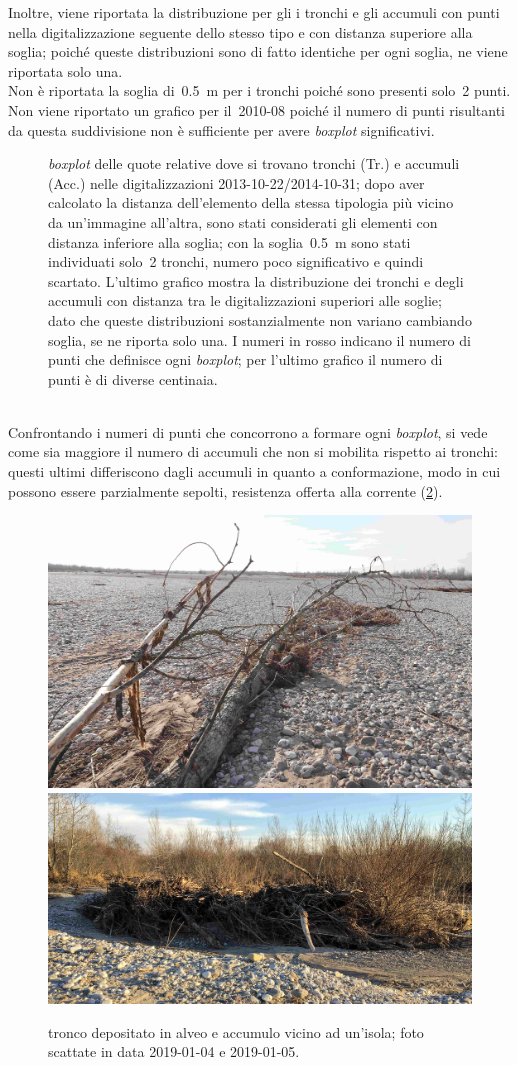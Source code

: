 Inoltre, viene riportata la distribuzione per gli i tronchi e gli accumuli con punti nella digitalizzazione seguente dello stesso tipo e con distanza superiore alla soglia; poiché queste distribuzioni sono di fatto identiche per ogni soglia, ne viene riportata solo una.
\\
Non è riportata la soglia di~\SI{0.5}{\m} per i tronchi poiché sono presenti solo~2 punti.
Non viene riportato un grafico per il~2010-08 poiché il numero di punti risultanti da questa suddivisione non è sufficiente per avere \emph{boxplot} significativi.
%
\begin{figure}
	\centering
	
	\caption[\emph{boxplot} delle quote relative distinte per tronchi e accumuli legnosi]{\emph{boxplot} delle quote relative dove si trovano tronchi (Tr.) e accumuli (Acc.) nelle digitalizzazioni 2013-10-22/2014-10-31; dopo aver calcolato la distanza dell'elemento della stessa tipologia più vicino da un'immagine all'altra, sono stati considerati gli elementi con distanza inferiore alla soglia; con la soglia~\SI{0.5}{\m} sono stati individuati solo~\num{2} tronchi, numero poco significativo e quindi scartato.
	L'ultimo grafico mostra la distribuzione dei tronchi e degli accumuli con distanza tra le digitalizzazioni superiori alle soglie; dato che queste distribuzioni sostanzialmente non variano cambiando soglia, se ne riporta solo una.
	I numeri in rosso indicano il numero di punti che definisce ogni \emph{boxplot}; per l'ultimo grafico il numero di punti è di diverse centinaia.}
	\label{graph:legno-wj-dem-detrended-distanza}
\end{figure}
%
\\
Confrontando i numeri di punti che concorrono a formare ogni \emph{boxplot}, si vede come sia maggiore il numero di accumuli che non si mobilita rispetto ai tronchi: questi ultimi differiscono dagli accumuli in quanto a conformazione, modo in cui possono essere parzialmente sepolti, resistenza offerta alla corrente (\cref{fig:tronco-vs-accumulo}).
%
\begin{figure}
	\centering
	\includegraphics[height = 0.27\textwidth]{files/tronco.jpeg}
	\quad
	\includegraphics[height = 0.27\textwidth]{files/accumulo.jpeg}
	\caption[tronco depositato in alveo e accumulo vicino ad un'isola]{tronco depositato in alveo e accumulo vicino ad un'isola; foto scattate in data 2019-01-04 e 2019-01-05.}
	\label{fig:tronco-vs-accumulo}
\end{figure}
